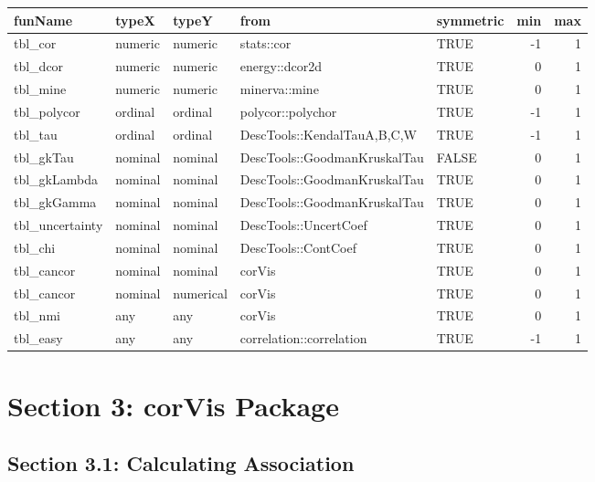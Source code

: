 \begin{Schunk}

\begin{tabular}[t]{lllllrr}
\toprule
funName & typeX & typeY & from & symmetric & min & max\\
\midrule
tbl\_cor & numeric & numeric & stats::cor & TRUE & -1 & 1\\
tbl\_dcor & numeric & numeric & energy::dcor2d & TRUE & 0 & 1\\
tbl\_mine & numeric & numeric & minerva::mine & TRUE & 0 & 1\\
tbl\_polycor & ordinal & ordinal & polycor::polychor & TRUE & -1 & 1\\
tbl\_tau & ordinal & ordinal & DescTools::KendalTauA,B,C,W & TRUE & -1 & 1\\
\addlinespace
tbl\_gkTau & nominal & nominal & DescTools::GoodmanKruskalTau & FALSE & 0 & 1\\
tbl\_gkLambda & nominal & nominal & DescTools::GoodmanKruskalTau & TRUE & 0 & 1\\
tbl\_gkGamma & nominal & nominal & DescTools::GoodmanKruskalTau & TRUE & 0 & 1\\
tbl\_uncertainty & nominal & nominal & DescTools::UncertCoef & TRUE & 0 & 1\\
tbl\_chi & nominal & nominal & DescTools::ContCoef & TRUE & 0 & 1\\
\addlinespace
tbl\_cancor & nominal & nominal & corVis & TRUE & 0 & 1\\
tbl\_cancor & nominal & numerical & corVis & TRUE & 0 & 1\\
tbl\_nmi & any & any & corVis & TRUE & 0 & 1\\
tbl\_easy & any & any & correlation::correlation & TRUE & -1 & 1\\
\bottomrule
\end{tabular}

\end{Schunk}

\hypertarget{section-3-corvis-package}{%
\section{Section 3: corVis Package}\label{section-3-corvis-package}}

\hypertarget{section-3.1-calculating-association}{%
\subsection{Section 3.1: Calculating
Association}\label{section-3.1-calculating-association}}

